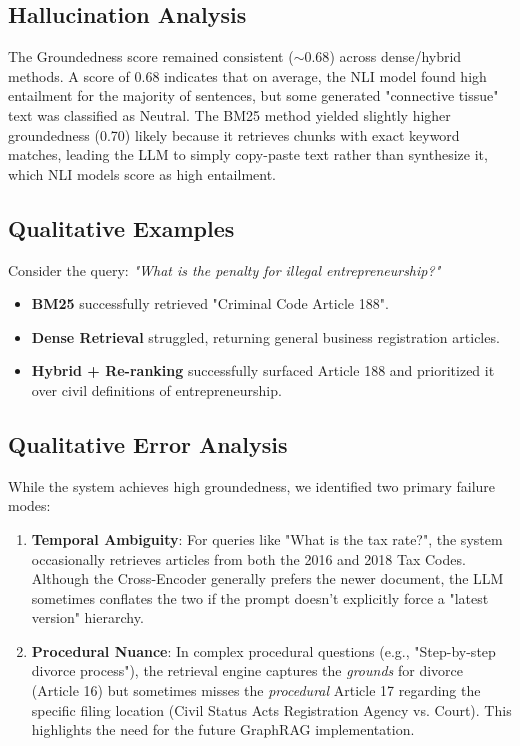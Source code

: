 \documentclass[11pt]{article}
\begin{document}
\subsection{Hallucination Analysis}
The Groundedness score remained consistent ($\sim0.68$) across dense/hybrid methods.
A score of 0.68 indicates that on average, the NLI model found high entailment for the majority of sentences, but some generated "connective tissue" text was classified as Neutral.
The BM25 method yielded slightly higher groundedness (0.70) likely because it retrieves chunks with exact keyword matches, leading the LLM to simply copy-paste text rather than synthesize it, which NLI models score as high entailment.

\subsection{Qualitative Examples}
Consider the query: \textit{"What is the penalty for illegal entrepreneurship?"}
\begin{itemize}
    \item \textbf{BM25} successfully retrieved "Criminal Code Article 188".
    \item \textbf{Dense Retrieval} struggled, returning general business registration articles.
    \item \textbf{Hybrid + Re-ranking} successfully surfaced Article 188 and prioritized it over civil definitions of entrepreneurship.
\end{itemize}

\subsection{Qualitative Error Analysis}
While the system achieves high groundedness, we identified two primary failure modes:
\begin{enumerate}
    \item \textbf{Temporal Ambiguity}: For queries like "What is the tax rate?", the system occasionally retrieves articles from both the 2016 and 2018 Tax Codes. Although the Cross-Encoder generally prefers the newer document, the LLM sometimes conflates the two if the prompt doesn't explicitly force a "latest version" hierarchy.
    \item \textbf{Procedural Nuance}: In complex procedural questions (e.g., "Step-by-step divorce process"), the retrieval engine captures the \textit{grounds} for divorce (Article 16) but sometimes misses the \textit{procedural} Article 17 regarding the specific filing location (Civil Status Acts Registration Agency vs. Court). This highlights the need for the future GraphRAG implementation.
\end{enumerate}
\end{document}
